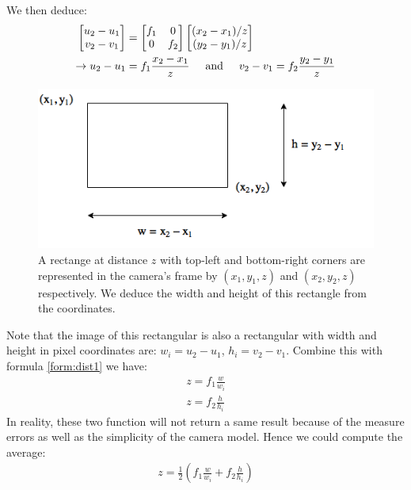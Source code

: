 We then deduce:
\begin{align}
	\begin{bmatrix}
		u_2 - u_1\\
		v_2 - v_1
	\end{bmatrix} &= \begin{bmatrix}
	f_1 & 0 \\
	0 & f_2 
\end{bmatrix} \begin{bmatrix}
(x_2 - x_1)/z\\
(y_2 - y_1)/z
\end{bmatrix} \nonumber\\
\label{form:dist1}
\rightarrow u_2 - u_1 &= f_1 \frac{x_2 - x_1}{z} \hspace{0.5cm} \text{and} \hspace{0.5cm} v_2 - v_1 = f_2 \frac{y_2 - y_1}{z} 
\end{align}

\begin{figure}[tb]
	\centering
	\includegraphics[width=0.6\hsize]{./figures/rectForm}
	\caption{A rectange at distance $z$ with top-left and bottom-right corners are represented in the camera's frame by $(x_1, y_1, z)$ and $(x_2, y_2, z)$ respectively. We deduce the width and height of this rectangle from the coordinates.}
	\label{fig:rectForm}
\end{figure}

Note that the image of this rectangular is also a rectangular with width and height in pixel coordinates are: $w_{i} = u_2 - u_1$, $h_{i} = v_2 - v_1$. Combine this with formula \ref{form:dist1} we have:
\begin{align}
\label{form:dist2}
z = f_1  \frac{w}{w_i} \nonumber \\
z = f_2  \frac{h}{h_i}
\end{align}
In reality, these two function will not return a same result because of the measure errors as well as the simplicity of the camera model. Hence we could compute the average:
\begin{align}
z = \frac{1}{2} (f_1 \frac{w}{w_i} + f_2 \frac{h}{h_i})
\label{form:distEst}
\end{align}

